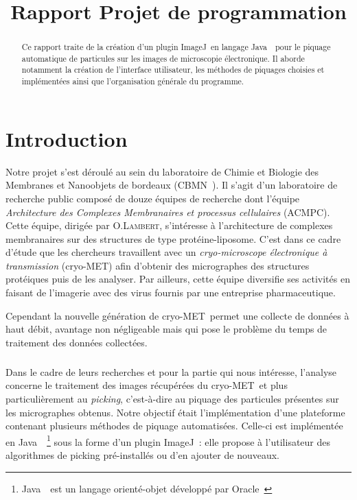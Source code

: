 \documentclass[11pt,a4paper]{report}
\title{Rapport Projet de programmation}
\begin{document}

\newcommand{\cme}{cryo-MET}
\newcommand{\java}{Java~{\tiny \texttrademark}}
\newcommand{\js}{JavaScript}
\newcommand{\imj}{ImageJ}

\begin{abstract}
Ce rapport traite de la création d'un plugin \imj ~en langage \java ~pour le piquage automatique de particules
sur les images de microscopie électronique. 
Il aborde notamment la création de l'interface utilisateur, 
les méthodes de piquages choisies et implémentées ainsi que l'organisation générale du programme.
\end{abstract}

\tableofcontents
\chapter*{Introduction}
Notre projet s'est déroulé au sein du laboratoire de Chimie et Biologie des Membranes et Nanoobjets de bordeaux (CBMN~\cite{cbmn:url}).
Il s'agit d'un laboratoire de recherche public composé de douze équipes de recherche dont l'équipe \emph{Architecture des Complexes Membranaires et processus cellulaires} (ACMPC). %
Cette équipe, dirigée par O.\textsc{Lambert}, s'intéresse à l'architecture de complexes membranaires sur des structures de type protéine-liposome. C'est dans ce cadre d'étude que les chercheurs travaillent avec un \emph{cryo-microscope électronique à transmission} (\cme) afin d'obtenir des micrographes des structures protéiques puis de les analyser. Par ailleurs, cette équipe diversifie ses activités en faisant de l'imagerie avec des virus fournis par une entreprise pharmaceutique.

\noindent
Cependant la nouvelle génération de \cme ~permet une collecte de données à haut débit, avantage non négligeable mais qui pose le problème du temps de traitement des données collectées. %

\paragraph*{}
Dans le cadre de leurs recherches et pour la partie qui nous intéresse, l'analyse concerne le traitement des images récupérées du \cme\ et plus particulièrement au \emph{picking}, c'est-à-dire au piquage des particules présentes sur les micrographes obtenus. %
Notre objectif était l'implémentation d'une plateforme contenant plusieurs méthodes de piquage automatisées.
Celle-ci est implémentée en \java ~\footnote{\java\ est un langage orienté-objet développé par Oracle~\cite{java:url}} sous la forme d'un plugin \imj~\cite{imagej:url}: elle propose à l'utilisateur des algorithmes de picking pré-installés ou d'en ajouter de nouveaux.
\end{document}
